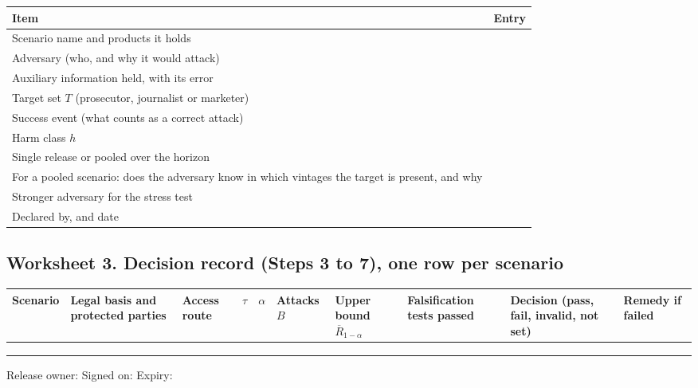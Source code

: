 \begin{center}
\small
\begin{tabular}{@{}>{\raggedright\arraybackslash}p{5.2cm}>{\raggedright\arraybackslash}p{9.4cm}@{}}
\toprule
Item & Entry \\
\midrule
Scenario name and products it holds & \\[6pt]
Adversary (who, and why it would attack) & \\[6pt]
Auxiliary information held, with its error & \\[6pt]
Target set $T$ (prosecutor, journalist or marketer) & \\[6pt]
Success event (what counts as a correct attack) & \\[6pt]
Harm class $h$ & \\[6pt]
Single release or pooled over the horizon & \\[6pt]
For a pooled scenario: does the adversary know in which vintages the target is present, and why & \\[6pt]
Stronger adversary for the stress test & \\[6pt]
Declared by, and date & \\[6pt]
\bottomrule
\end{tabular}
\end{center}

\subsection*{Worksheet 3. Decision record (Steps 3 to 7), one row per scenario}

\begin{center}
\footnotesize
\setlength{\tabcolsep}{3pt}
\begin{tabular}{@{}>{\raggedright\arraybackslash}p{1.6cm}>{\raggedright\arraybackslash}p{1.8cm}>{\raggedright\arraybackslash}p{1.3cm}>{\raggedright\arraybackslash}p{0.7cm}>{\raggedright\arraybackslash}p{0.7cm}>{\raggedright\arraybackslash}p{1.1cm}>{\raggedright\arraybackslash}p{1.5cm}>{\raggedright\arraybackslash}p{1.6cm}>{\raggedright\arraybackslash}p{1.7cm}>{\raggedright\arraybackslash}p{1.5cm}@{}}
\toprule
Scenario & Legal basis and protected parties & Access route & $\tau$ & $\alpha$ & Attacks $B$ & Upper bound $\overline{R}_{1-\alpha}$ & Falsification tests passed & Decision (pass, fail, invalid, not set) & Remedy if failed \\
\midrule
 & & & & & & & & & \\[10pt]
 & & & & & & & & & \\[10pt]
 & & & & & & & & & \\[10pt]
\bottomrule
\end{tabular}
\end{center}
\noindent Release owner: \hrulefill\quad Signed on: \hrulefill\quad Expiry: \hrulefill

